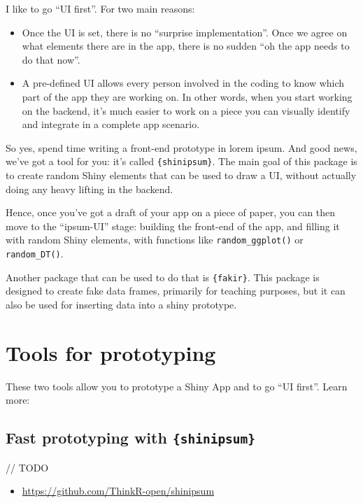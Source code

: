 \documentclass[]{book}
\providecommand{\tightlist}{%
  \setlength{\itemsep}{0pt}\setlength{\parskip}{0pt}}
\begin{document}
I like to go ``UI first''. For two main reasons:

\begin{itemize}
\tightlist
\item
  Once the UI is set, there is no ``surprise implementation''. Once we agree on what elements there are in the app, there is no sudden ``oh the app needs to do that now''.
\item
  A pre-defined UI allows every person involved in the coding to know which part of the app they are working on. In other words, when you start working on the backend, it's much easier to work on a piece you can visually identify and integrate in a complete app scenario.
\end{itemize}

So yes, spend time writing a front-end prototype in lorem ipsum. And good news, we've got a tool for you: it's called \texttt{\{shinipsum\}}. The main goal of this package is to create random Shiny elements that can be used to draw a UI, without actually doing any heavy lifting in the backend.

Hence, once you've got a draft of your app on a piece of paper, you can then move to the ``ipsum-UI'' stage: building the front-end of the app, and filling it with random Shiny elements, with functions like \texttt{random\_ggplot()} or \texttt{random\_DT()}.

Another package that can be used to do that is \texttt{\{fakir\}}. This package is designed to create fake data frames, primarily for teaching purposes, but it can also be used for inserting data into a shiny prototype.

\hypertarget{proto}{%
\chapter{Tools for prototyping}\label{proto}}

These two tools allow you to prototype a Shiny App and to go ``UI first''. Learn more:

\hypertarget{fast-prototyping-with-shinipsum}{%
\section{\texorpdfstring{Fast prototyping with \texttt{\{shinipsum\}}}{Fast prototyping with \{shinipsum\}}}\label{fast-prototyping-with-shinipsum}}

// TODO

\begin{itemize}
\tightlist
\item
  \url{https://github.com/ThinkR-open/shinipsum}
\end{itemize}
\end{document}

